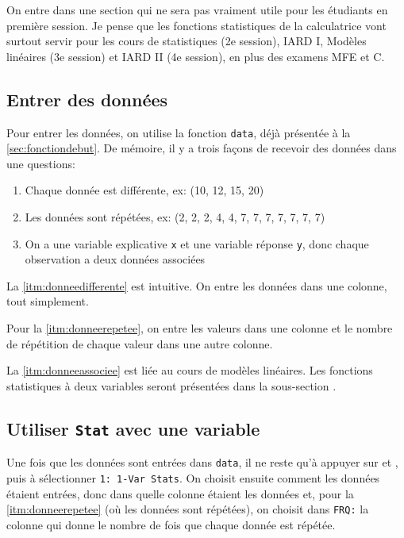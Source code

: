 \documentclass[french]{article}
\begin{document}
On entre dans une section qui ne sera pas vraiment utile pour les étudiants en première session. Je pense que les fonctions statistiques de la calculatrice vont surtout servir pour les cours de statistiques (2e session), IARD I, Modèles linéaires (3e session) et IARD II (4e session), en plus des examens MFE et C.

\subsection{Entrer des données}
\label{subsec:EntrerDonnees}

Pour entrer les données, on utilise la fonction \texttt{data}, déjà présentée à la \autoref{sec:fonctiondebut}. De mémoire, il y a trois façons de recevoir des données dans une questions:

\begin{enumerate}

\item Chaque donnée est différente, ex: (10, 12, 15, 20)
\label{itm:donneedifferente}

\item Les données sont répétées, ex: (2, 2, 2, 4, 4, 7, 7, 7, 7, 7, 7, 7)
\label{itm:donneerepetee}

\item On a une variable explicative \texttt{x} et une variable réponse \texttt{y}, donc chaque observation a deux données associées
\label{itm:donneeassociee}

\end{enumerate}

La \autoref{itm:donneedifferente} est intuitive. On entre les données dans une colonne, tout simplement.

Pour la \autoref{itm:donneerepetee}, on entre les valeurs dans une colonne et le nombre de répétition de chaque valeur dans une autre colonne.

La \autoref{itm:donneeassociee} est liée au cours de modèles linéaires. Les fonctions statistiques à deux variables seront présentées dans la sous-section .

\subsection{Utiliser \texttt{Stat} avec une variable}

Une fois que les données sont entrées dans \texttt{data}, il ne reste qu'à appuyer sur  et , puis à sélectionner \texttt{1: 1-Var Stats}. On choisit ensuite comment les données étaient entrées, donc dans quelle colonne étaient les données et, pour la \autoref{itm:donneerepetee} (où les données sont répétées), on choisit dans \texttt{FRQ:} la colonne qui donne le nombre de fois que chaque donnée est répétée.
\end{document}
